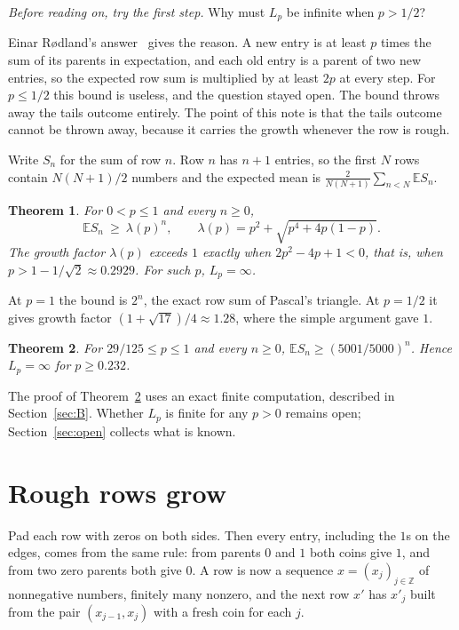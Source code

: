 \documentclass[11pt]{article}
\newtheorem{theorem}{Theorem}
\theoremstyle{remark}
\newcommand{\E}{\mathbb{E}}
\begin{document}
\emph{Before reading on, try the first step.} Why must $L_p$ be infinite when $p>1/2$?

Einar R{\o}dland's answer~\cite{Rodland} gives the reason. A new entry is at least $p$ times the sum of its parents in expectation, and each old entry is a parent of two new entries, so the expected row sum is multiplied by at least $2p$ at every step. For $p\le1/2$ this bound is useless, and the question stayed open. The bound throws away the tails outcome entirely. The point of this note is that the tails outcome cannot be thrown away, because it carries the growth whenever the row is rough.

Write $S_n$ for the sum of row $n$. Row $n$ has $n+1$ entries, so the first $N$ rows contain $N(N+1)/2$ numbers and the expected mean is $\frac{2}{N(N+1)}\sum_{n<N}\E S_n$.

\begin{theorem}\label{thm:A}
For $0<p\le1$ and every $n\ge0$,
\[
\E S_n\ \ge\ \lambda(p)^n,\qquad \lambda(p)=p^2+\sqrt{p^4+4p(1-p)} .
\]
The growth factor $\lambda(p)$ exceeds $1$ exactly when $2p^2-4p+1<0$, that is, when $p>1-1/\sqrt2\approx0.2929$. For such $p$, $L_p=\infty$.
\end{theorem}

At $p=1$ the bound is $2^n$, the exact row sum of Pascal's triangle. At $p=1/2$ it gives growth factor $(1+\sqrt{17})/4\approx1.28$, where the simple argument gave $1$.

\begin{theorem}\label{thm:B}
For $29/125\le p\le1$ and every $n\ge0$, $\E S_n\ge(5001/5000)^n$. Hence $L_p=\infty$ for $p\ge0.232$.
\end{theorem}

The proof of Theorem~\ref{thm:B} uses an exact finite computation, described in Section~\ref{sec:B}. Whether $L_p$ is finite for any $p>0$ remains open; Section~\ref{sec:open} collects what is known.

\section{Rough rows grow}

Pad each row with zeros on both sides. Then every entry, including the $1$s on the edges, comes from the same rule: from parents $0$ and $1$ both coins give $1$, and from two zero parents both give $0$. A row is now a sequence $x=(x_j)_{j\in\mathbb Z}$ of nonnegative numbers, finitely many nonzero, and the next row $x'$ has $x'_j$ built from the pair $(x_{j-1},x_j)$ with a fresh coin for each $j$.
\end{document}
